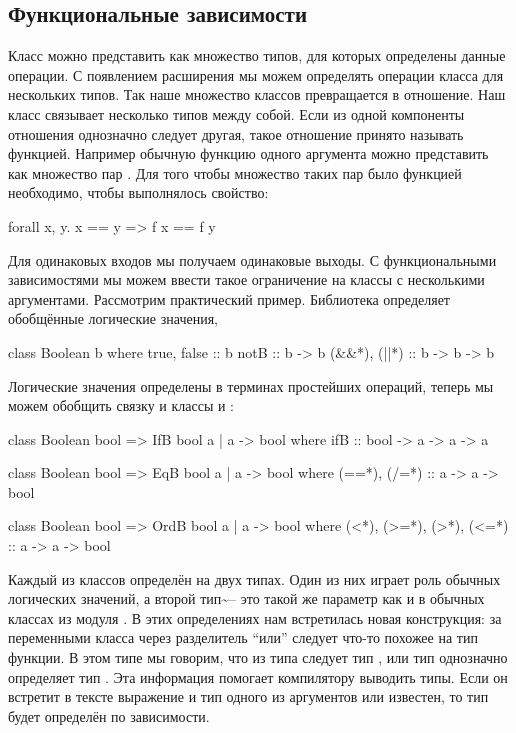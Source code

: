 \subsection{Функциональные зависимости}

Класс можно представить как множество типов, для которых определены
данные операции. С появлением расширения  мы
можем определять операции класса для нескольких типов. Так наше
множество классов превращается в отношение. Наш класс связывает
несколько типов между собой. Если из одной компоненты отношения
однозначно следует другая, такое отношение принято называть функцией.
Например обычную функцию одного аргумента можно представить как
множество пар . Для того чтобы множество таких пар было
функцией необходимо, чтобы выполнялось свойство:


\begin{code}
forall x, y.  x == y => f x == f y 
\end{code}

Для одинаковых входов мы получаем одинаковые выходы. С функциональными
зависимостями мы можем ввести такое ограничение на классы с несколькими
аргументами. Рассмотрим практический пример. Библиотека 
определяет обобщённые логические значения,


\begin{code}
class Boolean b where
    true, false :: b
    notB        :: b -> b
    (&&*), (||*) :: b -> b -> b
\end{code}

Логические значения определены в терминах простейших операций, теперь мы
можем обобщить связку  и классы  и :


\begin{code}
class Boolean bool => IfB bool a | a -> bool where
    ifB :: bool -> a -> a -> a

class Boolean bool => EqB bool a | a -> bool where
    (==*), (/=*) :: a -> a -> bool

class Boolean bool => OrdB bool a | a -> bool where
    (<*), (>=*), (>*), (<=*) :: a -> a -> bool
\end{code}

Каждый из классов определён на двух типах. Один из них играет роль
обычных логических значений, а второй тип\textasciitilde{}-- это такой
же параметр как и в обычных классах из модуля . В этих
определениях нам встретилась новая конструкция: за переменными класса
через разделитель ``или'' следует что-то похожее на тип функции. В этом
типе мы говорим, что из типа  следует тип , или тип
 однозначно определяет тип . Эта информация помогает
компилятору выводить типы. Если он встретит в тексте выражение
 и тип одного из аргументов  или  известен,
то тип  будет определён по зависимости.

